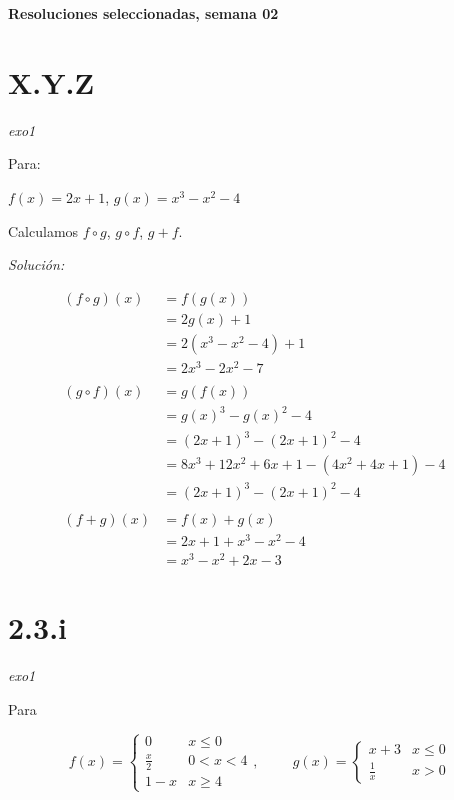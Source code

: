 \documentclass[10pt,a4paper]{article}
\renewcommand{\o}{\circ}
\begin{document}
\vspace{0,3cm}

\begin{center}
{\bf \Large Resoluciones seleccionadas, semana 02}
\end{center}

\vspace{0,3cm}

\section*{X.Y.Z}\emph{exo1}


\noindent
Para:

$ f(x) = 2x + 1$, \hspace{2cm} $g(x) = x^{3} - x^{2} - 4 $

\noindent
Calculamos $f \o g$, $g \o f$, $g + f$.


\noindent
\emph{Solución:}

\begin{align*}
  (f \o g)(x)
  &= f(g (x)) &\\
  &= 2g(x)+1 &\\
  &= 2 (x^3-x^2-4)+1 &\\
  &= 2x^3-2x^2-7 &\\ \\
  (g \o f)(x)
  &= g (f (x)) &\\
  &= g(x)^3-g(x)^2-4 &\\
  &= (2x+1)^3-(2x+1)^2-4 &\\
  &= 8 x^3 + 12 x^2 + 6 x + 1 - (4 x^2 + 4 x + 1) - 4 &\\
  &= (2x+1)^3-(2x+1)^2-4 & \\ \\
  (f + g) (x)
  &= f(x) + g (x) &\\
  &= 2x + 1 + x^3 - x^2 - 4 &\\
  &= x^3 - x^2 + 2x -3&
\end{align*}




\section*{2.3.i}\emph{exo1}


\noindent
Para

$$f(x) = \left \{ \begin{matrix} 0 & x \leq 0
\\ \frac{x}{2} & 0 < x < 4 
\\ 1- x & x \geq 4 \end{matrix}\right. , \hspace{1cm}
g(x) = \left \{ \begin{matrix} x +3 & x \leq 0
\\  \frac{1}{x} & x > 0 \end{matrix}\right.$$
\end{document}
